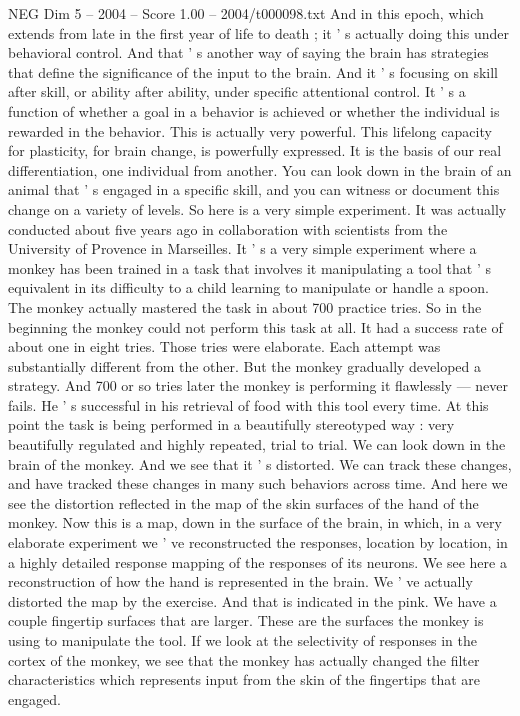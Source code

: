 \begin{textsample}{NEG Dim 5 – 2004 – Score 1.00 – 2004/t000098.txt}
And in this epoch, which extends from late in the first year of life to death ; it ' s actually doing this under behavioral control.
And that ' s another way of saying the brain has strategies that define the significance of the input to the brain.
And it ' s focusing on skill after skill, or ability after ability, under specific attentional control.
It ' s a function of whether a goal in a behavior is achieved or whether the individual is rewarded in the behavior.
This is actually very powerful.
This lifelong capacity for plasticity, for brain change, is powerfully expressed.
It is the basis of our real differentiation, one individual from another.
You can look down in the brain of an animal that ' s engaged in a specific skill, and you can witness or document this change on a variety of levels.
So here is a very simple experiment.
It was actually conducted about five years ago in collaboration with scientists from the University of Provence in Marseilles.
It ' s a very simple experiment where a monkey has been trained in a task that involves it manipulating a tool that ' s equivalent in its difficulty to a child learning to manipulate or handle a spoon.
The monkey actually mastered the task in about 700 practice tries.
So in the beginning the monkey could not perform this task at all.
It had a success rate of about one in eight tries.
Those tries were elaborate.
Each attempt was substantially different from the other.
But the monkey gradually developed a strategy.
And 700 or so tries later the monkey is performing it flawlessly — never fails.
He ' s successful in his retrieval of food with this tool every time.
At this point the task is being performed in a beautifully stereotyped way : very beautifully regulated and highly repeated, trial to trial.
We can look down in the brain of the monkey.
And we see that it ' s distorted.
We can track these changes, and have tracked these changes in many such behaviors across time.
And here we see the distortion reflected in the map of the skin surfaces of the hand of the monkey.
Now this is a map, down in the surface of the brain, in which, in a very elaborate experiment we ' ve reconstructed the responses, location by location, in a highly detailed response mapping of the responses of its neurons.
We see here a reconstruction of how the hand is represented in the brain.
We ' ve actually distorted the map by the exercise.
And that is indicated in the pink.
We have a couple fingertip surfaces that are larger.
These are the surfaces the monkey is using to manipulate the tool.
If we look at the selectivity of responses in the cortex of the monkey, we see that the monkey has actually changed the filter characteristics which represents input from the skin of the fingertips that are engaged.

\end{textsample}
